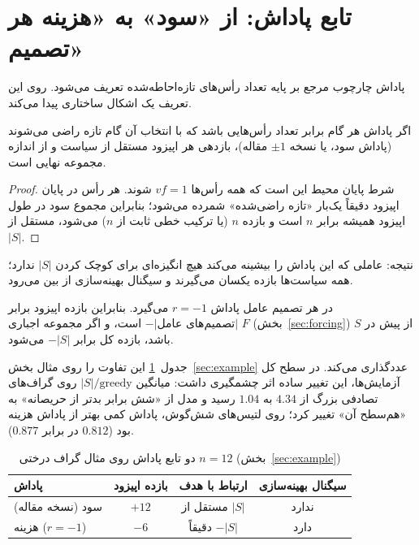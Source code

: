 \section{تابع پاداش: از «سود» به «هزینه هر تصمیم»}
\label{sec:reward}

پاداش چارچوب مرجع بر پایه تعداد رأس‌های تازه‌احاطه‌شده تعریف می‌شود. روی
 این تعریف یک اشکال ساختاری پیدا می‌کند.

\begin{theorem}
\label{thm:gain}
اگر پاداش هر گام برابر تعداد رأس‌هایی باشد که با انتخاب آن گام تازه راضی
می‌شوند (پاداش سود، یا نسخه $\pm 1$ مقاله)، بازدهی هر اپیزود مستقل از سیاست و
از اندازه مجموعه نهایی است.
\end{theorem}

\begin{proof}
شرط پایان محیط این است که همه رأس‌ها $vf=1$ شوند. هر رأس در پایان اپیزود
دقیقاً یک‌بار «تازه راضی‌شده» شمرده می‌شود؛ بنابراین مجموع سود در طول اپیزود
همیشه برابر $n$ است و بازده $n$ (یا ترکیب خطی ثابت از $n$) می‌شود، مستقل از
$|S|$.
\end{proof}

نتیجه: عاملی که این پاداش را بیشینه می‌کند هیچ انگیزه‌ای برای کوچک کردن $|S|$
ندارد؛ همه سیاست‌ها بازده یکسان می‌گیرند و سیگنال بهینه‌سازی از بین می‌رود.

\begin{definition}
\label{def:size-reward}
در هر تصمیم عامل پاداش $r=-1$ می‌گیرد. بنابراین بازده اپیزود برابر
$-|\text{تصمیم‌های عامل}|$ است، و اگر مجموعه اجباری $F$ (بخش~\ref{sec:forcing})
از پیش در $S$ باشد، بازده کل برابر $-|S|$ می‌شود.
\end{definition}

جدول~\ref{tab:reward} این تفاوت را روی مثال بخش~\ref{sec:example} عددگذاری می‌کند.
در سطح کل آزمایش‌ها، این تغییر ساده اثر چشمگیری داشت: میانگین
$|S|/\text{greedy}$ روی گراف‌های تصادفی بزرگ از $4.34$ به $1.04$ رسید و
مدل از «شش برابر بدتر از حریصانه» به «هم‌سطح آن» تغییر کرد؛ روی لتیس‌های
شش‌گوش، پاداش  کمی بهتر از پاداش هزینه بود ($0.812$ در برابر
$0.877$).

\begin{table}[ht]
  \centering
  \caption{دو تابع پاداش روی مثال گراف درختی $n=12$ (بخش~\ref{sec:example})}
  \label{tab:reward}
  \begin{tabular}{lccc}
    \toprule
    پاداش & بازده اپیزود & ارتباط با هدف & سیگنال بهینه‌سازی \\
    \midrule
    سود (نسخه مقاله) & $+12$ & مستقل از $|S|$ & ندارد \\
    هزینه ($r=-1$) & $-6$ & دقیقاً $-|S|$ & دارد \\
    \bottomrule
  \end{tabular}
\end{table}

